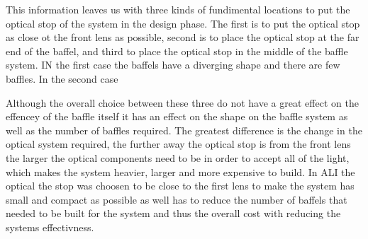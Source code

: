 This information leaves us with three kinds of fundimental locations to put the optical stop of the system in the design phase. The first is to put the optical stop as close ot the front lens as possible, second is to place the optical stop at the far end of the baffel, and third to place the optical stop in the middle of the baffle system. IN the first case the baffels have a  diverging shape and there are few baffles. In the second case

Although the overall choice between these three do not have  a great effect on the effencey of the baffle itself it has an effect on the shape on the baffle system as well as the number of baffles required. The greatest difference is the change in the optical system required, the further away the optical stop is from the front lens the larger the optical components need to be in order to accept all of the light, which makes the system heavier, larger and more expensive to build. In ALI the optical the stop was choosen to be close to the first lens to make the system has small and compact as possible as well has to reduce the number of baffels that needed to be built for the system and thus the overall cost with reducing the systems effectivness.
